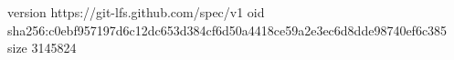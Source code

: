 version https://git-lfs.github.com/spec/v1
oid sha256:c0ebf957197d6c12dc653d384cf6d50a4418ce59a2e3ec6d8dde98740ef6c385
size 3145824
